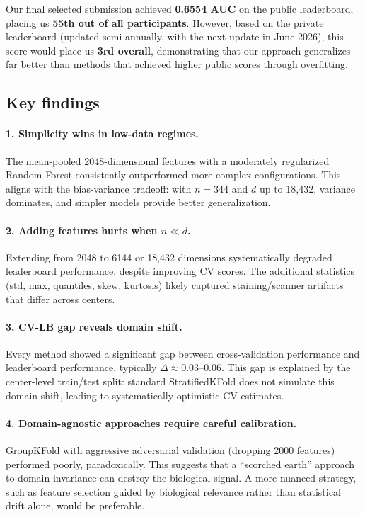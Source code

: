 \documentclass[11pt,a4paper]{article}
\begin{document}
Our final selected submission achieved \textbf{0.6554 AUC} on the public leaderboard, placing us \textbf{55th out of all participants}. However, based on the private leaderboard (updated semi-annually, with the next update in June 2026), this score would place us \textbf{3rd overall}, demonstrating that our approach generalizes far better than methods that achieved higher public scores through overfitting.

\subsection{Key findings}

\paragraph{1. Simplicity wins in low-data regimes.}
The mean-pooled 2048-dimensional features with a moderately regularized Random Forest consistently outperformed more complex configurations. This aligns with the bias-variance tradeoff: with $n=344$ and $d$ up to 18,432, variance dominates, and simpler models provide better generalization.

\paragraph{2. Adding features hurts when $n \ll d$.}
Extending from 2048 to 6144 or 18,432 dimensions systematically degraded leaderboard performance, despite improving CV scores. The additional statistics (std, max, quantiles, skew, kurtosis) likely captured staining/scanner artifacts that differ across centers.

\paragraph{3. CV-LB gap reveals domain shift.}
Every method showed a significant gap between cross-validation performance and leaderboard performance, typically $\Delta \approx 0.03$--$0.06$. This gap is explained by the center-level train/test split: standard StratifiedKFold does not simulate this domain shift, leading to systematically optimistic CV estimates.

\paragraph{4. Domain-agnostic approaches require careful calibration.}
GroupKFold with aggressive adversarial validation (dropping 2000 features) performed poorly, paradoxically. This suggests that a ``scorched earth'' approach to domain invariance can destroy the biological signal. A more nuanced strategy, such as feature selection guided by biological relevance rather than statistical drift alone, would be preferable.
\end{document}
